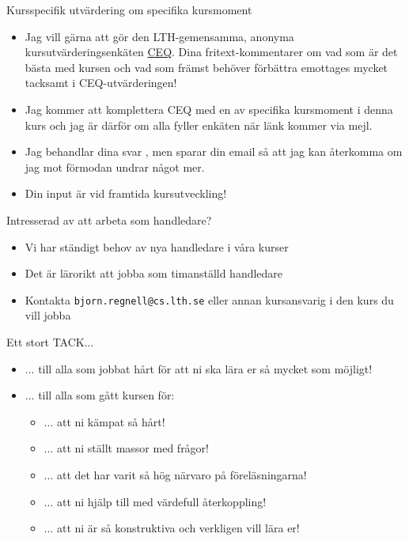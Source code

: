 \begin{Slide}{Kursspecifik utvärdering om specifika kursmoment}\SlideFontSmall
\begin{itemize}
\item Jag vill gärna att  gör den LTH-gemensamma, anonyma kursutvärderingsenkäten \href{https://www.ceq.lth.se/}{CEQ}. Dina fritext-kommentarer om vad som är det bästa med kursen och vad som främst behöver förbättra emottages mycket tacksamt i CEQ-utvärderingen!
\item Jag kommer att komplettera CEQ med en  av specifika kursmoment i denna kurs och jag är därför  om alla fyller enkäten när länk kommer via mejl.
\item Jag behandlar dina svar , men sparar din email så att jag kan återkomma om jag mot förmodan undrar något mer.
\item Din input är  vid framtida kursutveckling!
\end{itemize}
\end{Slide}

\begin{Slide}{Intresserad av att arbeta som handledare?}
\begin{itemize}
\item Vi har ständigt behov av nya handledare i våra kurser
\item Det är lärorikt att jobba som timanställd handledare
\item Kontakta \verb|bjorn.regnell@cs.lth.se| eller annan kursansvarig i den kurs du vill jobba
\end{itemize}
\end{Slide}


\begin{Slide}{Ett stort TACK...}
\begin{itemize}
  \item
... till alla  som jobbat hårt för att ni ska lära er så mycket som möjligt!
\item ... till alla  som gått kursen för:
\begin{itemize}
\item ... att ni kämpat så hårt!
\item ... att ni ställt massor med frågor!
\item ... att det har varit så hög närvaro på föreläsningarna!
\item ... att ni hjälp till med värdefull återkoppling!
\item ... att ni är så konstruktiva och verkligen vill lära er!
\end{itemize}
\vspace{2em} \pause

\end{itemize}
\end{Slide}

